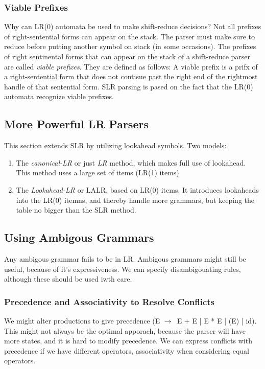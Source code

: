 \documentclass{article}
\newcommand{\ta}{$\to$~}
\begin{document}
\subsubsection{Viable Prefixes} %
\label{ssub:Viable Prefixes}
Why can LR(0) automata be used to make shift-reduce decisions? Not all prefixes of right-sentential forms can appear on the stack. The parser must make sure to reduce before putting another symbol on stack (in some occasions). The prefixes of right sentinental forms that can appear on the stack of a shift-reduce parser are called \emph{viable prefixes}. They are defined as follows: A viable prefix is a prifx of a right-sentential form that does not contisue past the right end of the rightmost handle of that sentential form. SLR parsing is pased on the fact that the LR(0) automata recognize viable prefixes.


\subsection{More Powerful LR Parsers} %
\label{sub:More Powerful LR Parsers}
This section extends SLR by utilizing lookahead symbols. Two models:
\begin{enumerate}
	\item The \emph{canonical-LR} or just \emph{LR} method, which makes full use of lookahead. This method uses a large set of items (LR(1) items)
	\item The \emph{Lookahead-LR} or LALR, based on LR(0) items. It introduces lookaheads into the LR(0) itemns, and thereby handle more grammars, but keeping the table no bigger than the SLR method.
\end{enumerate}

\subsection{Using Ambigous Grammars} %
\label{sub:Using Ambigous Grammars}
Any ambigous grammar fails to be in LR. Ambigous grammars might still be useful, because of it's expressiveness. We can specify disambigouating rules, although these should be used iwth care.

\subsubsection{Precedence and Associativity to Resolve Conflicts} %
\label{ssub:Precedence an dAssociativity to Resolve Conflicts}
We might alter productions to give precedence (E \ta E + E | E * E | (E) | id). This might not always be the optimal apporach, because the parser will have more states, and it is hard to modify precedence. We can express conflicts with precedence if we have different operators, associativity when considering equal operators.
\end{document}
